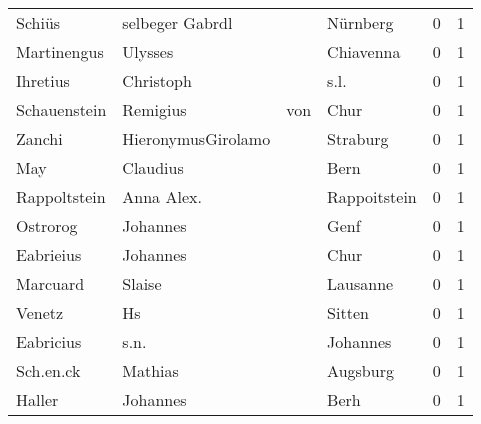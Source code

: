 \begin{center}
\begin{tiny}
\begin{longtabu}{llllrr}
                   Schiüs &                    selbeger Gabrdl &             &                                    Nürnberg &          0 &         1 \\
              Martinengus &                            Ulysses &             &                                   Chiavenna &          0 &         1 \\
                 Ihretius &                          Christoph &             &                                        s.l. &          0 &         1 \\
             Schauenstein &                           Remigius &         von &                                        Chur &          0 &         1 \\
                   Zanchi &                 HieronymusGirolamo &             &                                    Straburg &          0 &         1 \\
                      May &                           Claudius &             &                                        Bern &          0 &         1 \\
             Rappoltstein &                         Anna Alex. &             &                                Rappoitstein &          0 &         1 \\
                 Ostrorog &                           Johannes &             &                                        Genf &          0 &         1 \\
                Eabrieius &                           Johannes &             &                                        Chur &          0 &         1 \\
                 Marcuard &                             Slaise &             &                                    Lausanne &          0 &         1 \\
                   Venetz &                                 Hs &             &                                      Sitten &          0 &         1 \\
                Eabricius &                               s.n. &             &                                    Johannes &          0 &         1 \\
                Sch.en.ck &                            Mathias &             &                                    Augsburg &          0 &         1 \\
                   Haller &                           Johannes &             &                                        Berh &          0 &         1 \\

\end{longtabu}
\end{tiny}
\end{center}
